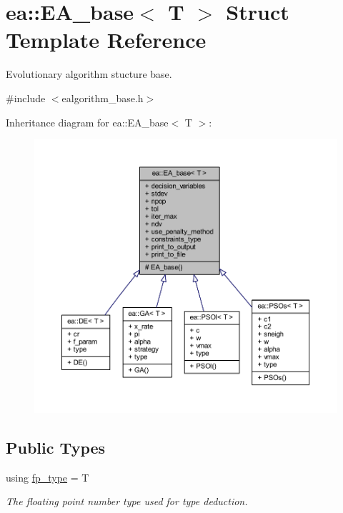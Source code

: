 \hypertarget{structea_1_1_e_a__base}{}\section{ea\+:\+:E\+A\+\_\+base$<$ T $>$ Struct Template Reference}
\label{structea_1_1_e_a__base}


Evolutionary algorithm stucture base.  




{\ttfamily \#include $<$ealgorithm\+\_\+base.\+h$>$}



Inheritance diagram for ea\+:\+:E\+A\+\_\+base$<$ T $>$\+:
\nopagebreak
\begin{figure}[H]
\begin{center}
\leavevmode
\includegraphics[width=350pt]{structea_1_1_e_a__base__inherit__graph}
\end{center}
\end{figure}
\subsection*{Public Types}
\begin{DoxyCompactItemize}
\item 
using \hyperlink{structea_1_1_e_a__base_ab626cb28104f750a38092a742c9fa996}{fp\+\_\+type} = T
\begin{DoxyCompactList}\small\item\em The floating point number type used for type deduction. \end{DoxyCompactList}\end{DoxyCompactItemize}
